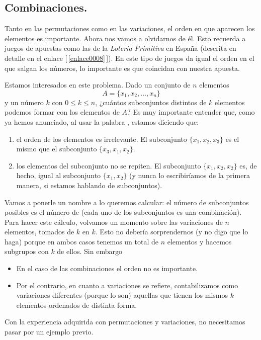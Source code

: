 \subsection{Combinaciones.}
\label{cap03:subsec:Combinaciones}

Tanto en las permutaciones como en las variaciones, el orden en que aparecen los elementos es
importante. Ahora nos vamos a olvidarnos de \'el. Esto recuerda a juegos de apuestas como las de la
{\em Loter\'ia Primitiva} en España (descrita en detalle en el enlace [\,\ref{enlace0008}\,]\label{enlace0008a}). En este tipo de juegos da igual el orden en el que salgan los n\'umeros, lo importante es que coincidan con nuestra apuesta.
	
Estamos interesados en este problema. Dado un conjunto de $n$ elementos
    \[A=\{x_1,x_2,\ldots,x_n\}\]
y un número $k$ con $0\leq k\leq n$, ¿cuántos {\sf subconjuntos distintos} de $k$ elementos podemos formar con los elementos de $A$? Es muy importante entender que, como ya hemos anunciado, al usar la palabra , estamos diciendo que:
    \begin{enumerate}
        \item el {\sf orden de los elementos es irrelevante}. El subconjunto $\{x_1,x_2,x_3\}$ es el mismo que el subconjunto $\{x_3,x_1,x_2\}$.
        \item los elementos del subconjunto {\sf no se repiten}. El subconjunto $\{x_1,x_2,x_2\}$ es, de hecho, igual al subconjunto $\{x_1,x_2\}$ (y nunca lo escribiríamos de la primera manera, si estamos hablando de subconjuntos).
    \end{enumerate}
Vamos a ponerle un nombre a lo queremos calcular: el número de subconjuntos posibles es el número de    (cada uno de los subconjuntos es una combinación). Para hacer este c\'alculo, volvamos un momento sobre las variaciones de $n$ elementos, tomados de $k$ en $k$.
Esto no deber\'ia sorprendernos (y no digo que lo haga) porque en ambos casos tenemos un total de $n$ elementos y hacemos subgrupos con $k$ de ellos. Sin embargo
    \begin{itemize}
    \item En el caso de las combinaciones el orden no es importante.
    \item Por el contrario, en cuanto a variaciones se refiere,
    contabilizamos como variaciones diferentes (porque lo son) aquellas que
    tienen los mismos $k$ elementos ordenados de distinta forma.
    \end{itemize}
Con la experiencia adquirida con permutaciones y variaciones, no necesitamos
pasar por un ejemplo previo.

